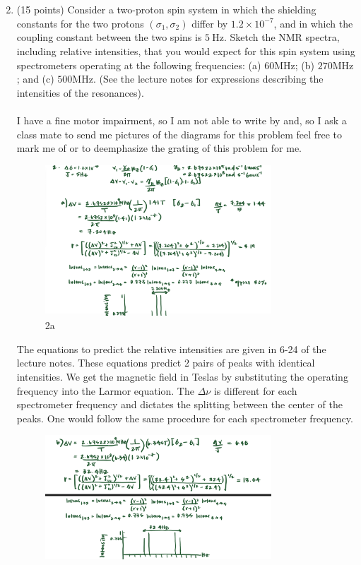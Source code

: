 \documentclass[12pt]{article}
\begin{document}
\section{}
\begin{enumerate}
  \setcounter{enumi}{1}
  \item (15 points) Consider a two-proton spin system in which the shielding constants for the two protons $\left(\sigma_{1}, \sigma_{2}\right)$ differ by $1.2 \times 10^{-7}$, and in which the coupling constant between the two spins is $5 \mathrm{~Hz}$. Sketch the NMR spectra, including relative intensities, that you would expect for this spin system using spectrometers operating at the following frequencies: (a) $60 \mathrm{MHz}$; (b) $270 \mathrm{MHz}$; and (c) $500 \mathrm{MHz}$. (See the lecture notes for expressions describing the intensities of the resonances).\\ \\
  I have a fine motor impairment, so I am not able to write by and, so I ask a class mate to send me pictures of the diagrams for this problem feel free to mark me of or to deemphasize the grating of this problem for me.
\begin{figure}[H]
  \centering
  \includegraphics[width=0.8\textwidth]{2a.png}
  \caption{2a}
  \label{fig:2a}
\end{figure}
The equations to predict the relative intensities are given in 6-24 of the lecture notes. These equations predict 2 pairs of peaks with identical intensities. We get the magnetic field in Teslas by substituting the operating frequency into the Larmor equation. The $\Delta \nu$ is different for each spectrometer frequency and dictates the splitting between the center of the peaks. One would follow the same procedure for each spectrometer frequency.
\begin{figure}[H]
  \centering
  \includegraphics[width=0.8\textwidth]{2b.png}

\end{figure}
\end{enumerate}
\end{document}
